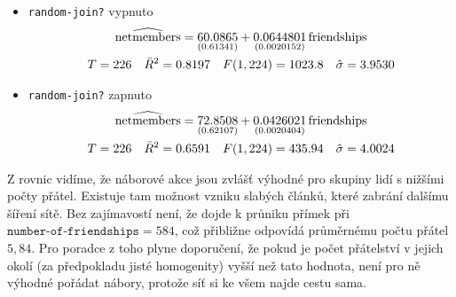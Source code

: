 \documentclass[a4wide,12pt]{report}
\begin{document}
\begin{itemize}
\item \texttt{random-join?} vypnuto\\
\begin{gather}
\widehat{\rm netmembers} = 
\underset{(0.61341)}{60.0865}
+\underset{(0.0020152)}{0.0644801}\,\mbox{friendships}
 \notag \\
T = 226 \quad \bar{R}^2 = 0.8197 \quad F(1,224) = 1023.8 \quad \hat{\sigma} = 3.9530 \notag
\end{gather}

\item \texttt{random-join?} zapnuto\\
\begin{gather}
\widehat{\rm netmembers} = 
\underset{(0.62107)}{72.8508}
+\underset{(0.0020404)}{0.0426021}\,\mbox{friendships}
 \notag \\
T = 226 \quad \bar{R}^2 = 0.6591 \quad F(1,224) = 435.94 \quad \hat{\sigma} = 4.0024 \notag
\end{gather}
\end{itemize}
Z rovnic vidíme, že náborové akce jsou zvlášť výhodné pro skupiny lidí s nižšími počty přátel. Existuje tam možnost vzniku slabých článků, které zabrání dalšímu šíření sítě. Bez zajímavostí není, že dojde k průniku přímek při $\texttt{number-of-friendships}=584$, což přibližne odpovídá průměrnému počtu přátel $5,84$. Pro poradce z toho plyne doporučení, že pokud je počet přátelství v jejich okolí (za předpokladu jisté homogenity) vyšší než tato hodnota, není pro ně výhodné pořádat nábory, protože síť si ke všem najde cestu sama.
\end{document}
